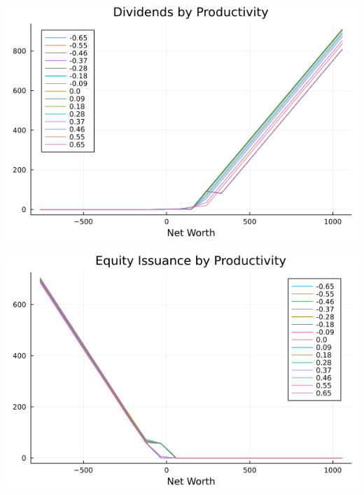\documentclass[usenames,dvipsnames, handout]{beamer}
\begin{document}
\begin{frame}
\begin{center}
\includegraphics[scale = 0.5]{dividends.png}
\end{center}
\end{frame}

\begin{frame}
\begin{center}
\includegraphics[scale = 0.5]{issuance.png}
\end{center}
\end{frame}
\end{document}
